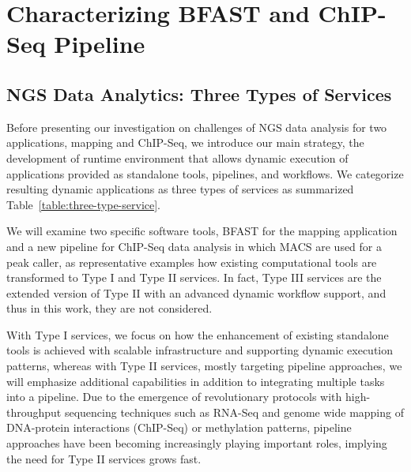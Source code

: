 \documentclass{cpeauth}
\begin{document}
\section{Characterizing BFAST and ChIP-Seq Pipeline}

\subsection{NGS Data Analytics: Three Types of Services}

Before presenting our investigation on challenges of NGS data analysis
for two applications, mapping and ChIP-Seq, we introduce our main
strategy, the development of runtime environment that allows dynamic
execution of applications provided as standalone tools, pipelines, and
workflows.  We categorize resulting dynamic applications as three
types of services as summarized
Table~\ref{table:three-type-service}.  

We will examine two specific
software tools, BFAST for the mapping application and a new pipeline for ChIP-Seq
data analysis in which MACS are used for a peak caller, as representative examples how existing computational
tools are transformed to Type I and Type II services.
In fact, Type III services are the extended version of Type II with an
advanced dynamic workflow support, and thus in this work, they are not
considered.  

With Type I services, we focus on how the enhancement of existing standalone tools is achieved with scalable
infrastructure and supporting dynamic execution patterns, whereas with Type II services, mostly targeting pipeline
approaches, we will emphasize additional capabilities in addition to integrating multiple tasks into a pipeline.  Due to the emergence of revolutionary protocols with high-throughput sequencing techniques such as RNA-Seq and genome wide mapping of DNA-protein interactions (ChIP-Seq) or methylation patterns, pipeline approaches have been becoming
increasingly playing important roles, implying the need for Type II services grows fast.

\end{document}
